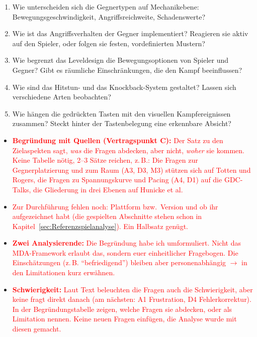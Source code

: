 \documentclass[../Main.tex]{subfiles}
\begin{document}
\begin{enumerate}[label=\textbf{M\arabic*}, leftmargin=1.5cm, itemsep=0.5em]
    \item Wie unterscheiden sich die Gegnertypen auf Mechanikebene: Bewegungsgeschwindigkeit, Angriffsreichweite, Schadenswerte?
    \item Wie ist das Angriffsverhalten der Gegner implementiert? Reagieren sie aktiv auf den Spieler, oder folgen sie festen, vordefinierten Mustern?
    \item Wie begrenzt das Leveldesign die Bewegungsoptionen von Spieler und Gegner? Gibt es räumliche Einschränkungen, die den Kampf beeinflussen?
    \item Wie sind das Hitstun- und das Knockback-System gestaltet? Lassen sich verschiedene Arten beobachten?
    \item Wie hängen die gedrückten Tasten mit den visuellen Kampfereignissen zusammen? Steckt hinter der Tastenbelegung eine erkennbare Absicht?
\end{enumerate}

\begin{itemize}[leftmargin=1.5cm]
    \item \textcolor{red}{\textbf{Begründung mit Quellen (Vertragspunkt C):} Der Satz zu den Zielaspekten sagt, \emph{was} die Fragen abdecken, aber nicht, \emph{woher} sie kommen. Keine Tabelle nötig, 2--3 Sätze reichen, z.\,B.: Die Fragen zur Gegnerplatzierung und zum Raum (A3, D3, M3) stützen sich auf Totten und Rogers, die Fragen zu Spannungskurve und Pacing (A4, D1) auf die GDC-Talks, die Gliederung in drei Ebenen auf Hunicke et al.}
    \item \textcolor{red}{Zur Durchführung fehlen noch: Plattform bzw.\ Version und ob ihr aufgezeichnet habt (die gespielten Abschnitte stehen schon in Kapitel~\ref{sec:Referenzspielanalyse}). Ein Halbsatz genügt.}
    \item \textcolor{red}{\textbf{Zwei Analysierende:} Die Begründung habe ich umformuliert. Nicht das MDA-Framework erlaubt das, sondern euer einheitlicher Fragebogen. Die Einschätzungen (z.\,B. \enquote{befriedigend}) bleiben aber personenabhängig $\rightarrow$ in den Limitationen kurz erwähnen.}
    \item \textcolor{red}{\textbf{Schwierigkeit:} Laut Text beleuchten die Fragen auch die Schwierigkeit, aber keine fragt direkt danach (am nächsten: A1 Frustration, D4 Fehlerkorrektur). In der Begründungstabelle zeigen, welche Fragen sie abdecken, oder als Limitation nennen. Keine neuen Fragen einfügen, die Analyse wurde mit diesen gemacht.}
\end{itemize}
\end{document}
